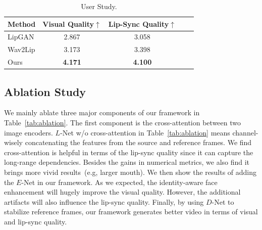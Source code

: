 \begin{table}[h]
\centering
\caption{User Study.}
\vspace{-1em}
\label{tab:user}
\begin{tabular}{lcccc}
\toprule
 Method & Visual Quality$\uparrow$ & Lip-Sync  Quality$\uparrow$ \\
\hline
LipGAN &    2.867 & 3.058    \\
Wav2Lip &   3.173 & 3.398   \\
Ours &      \textbf{4.171} & \textbf{4.100}  \\ 
\bottomrule 
\end{tabular}
\end{table}


\subsection{Ablation Study}
We mainly ablate three major components of our framework in Table~\ref{tab:ablation}. 
The first component is the cross-attention between two image encoders. 
$L$-Net w/o cross-attention in Table~\ref{tab:ablation} means channel-wisely concatenating the features from the source and reference frames.
We find cross-attention is helpful in terms of the lip-sync quality since it can capture the long-range dependencies. Besides the gains in numerical metrics, we also find it brings more vivid results~(e.g, larger mouth). We then show the results of adding the $E$-Net in our framework. As we expected, the identity-aware face enhancement will hugely improve the visual quality. However, the additional artifacts will also influence the lip-sync quality. Finally, by using $D$-Net to stabilize reference frames, our framework generates better video in terms of visual and lip-sync quality.

